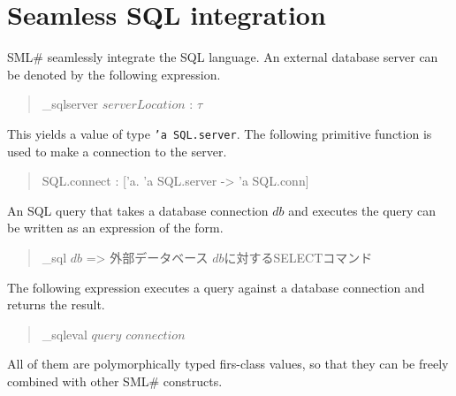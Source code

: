 \documentclass{jbook}
\newif\ifjp
\newcommand{\txt}[2]{#2}
\newcommand{\smlsharp}{SML\#}
\newenvironment{program}{\begin{quote}\begin{tt}}%
                        {\end{tt}\end{quote}}
\begin{document}
\section{\txt{SQL統合}{Seamless SQL integration}}
\ifjp%
	\smlsharp{}はシームレスにSQLを統合している．
	外部データベースを以下の式によって宣言できる．
\begin{program}
\_sqlserver $serverLocation$ : $\tau$
\end{program}
	この結果は，外部データベースを表す{\tt 'a SQL.server}型の値である．
	以下の関数によって，このデータベースに接続できる．
\begin{program}
SQL.connect : ['a. 'a SQL.server -> 'a SQL.conn]
\end{program}
	外部データベース接続を受け取り検索するSQL問い合わせ文，
\smlsharp{}の多相的な型を持つ式として記述することができる．
\begin{program}
\_sql $db$ => 外部データベース $db$に対するSELECTコマンド
\end{program}
	SQL問い合わせ文を以下の構文でデータベース接続に適用すると，
問い合わせの結果が得られる．
\begin{program}
\_sqleval $query$ $connection$
\end{program}
	これらはすべて型を持つ，従ってfirst-classの値であり，\smlsharp{}
の他の要素と自由に組み合わせて使用することができる．
\else%
	\smlsharp{} seamlessly integrate the SQL language.
	An external database server can be denoted by the following
expression.

\begin{program}
\_sqlserver $serverLocation$ : $\tau$
\end{program}
	This yields a value of type {\tt 'a SQL.server}.
	The following primitive function is used to make a connection to
the server.
\begin{program}
SQL.connect : ['a. 'a SQL.server -> 'a SQL.conn]
\end{program}
	An SQL query that takes a database connection $db$ and executes
the query can be written as an expression of the form.
\begin{program}
\_sql $db$ => 外部データベース $db$に対するSELECTコマンド
\end{program}
	The following expression executes a query against a database
connection and returns the result.
\begin{program}
\_sqleval $query$ $connection$
\end{program}
	All of them are polymorphically typed firs-class values, so
that they can be freely combined with other \smlsharp{} constructs.
\fi%
\end{document}

